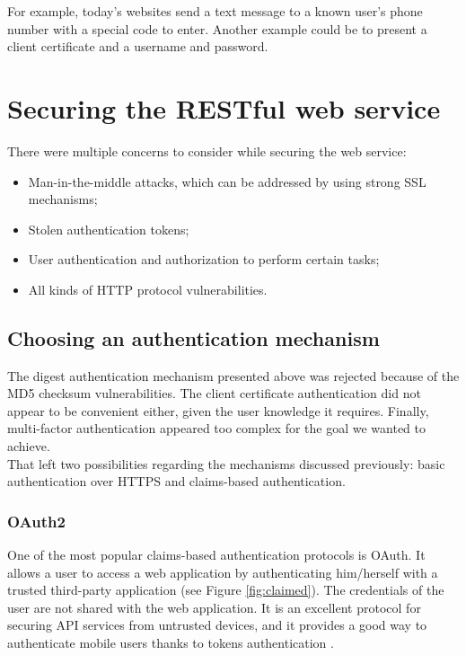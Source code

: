 \documentclass[a4paper, oneside, 11pt]{book}
\begin{document}
For example, today's websites send a text message to a known user's phone number with a special code to enter. Another example could be to present a client certificate and a username and password.

\section{Securing the RESTful web service}
There were multiple concerns to consider while securing the web service:
\begin{itemize}
	\item Man-in-the-middle attacks, which can be addressed by using strong SSL mechanisms;
	\item Stolen authentication tokens;
	\item User authentication and authorization to perform certain tasks;
	\item All kinds of HTTP protocol vulnerabilities.
\end{itemize}

\subsection{Choosing an authentication mechanism}
The digest authentication mechanism presented above was rejected because of the MD5 checksum vulnerabilities. The client certificate authentication did not appear to be convenient either, given the user knowledge it requires. Finally, multi-factor authentication appeared too complex for the goal we wanted to achieve.\\

That left two possibilities regarding the mechanisms discussed previously: basic authentication over HTTPS and claims-based authentication.

\subsubsection{OAuth2}
One of the most popular claims-based authentication protocols is OAuth. It allows a user to access a web application by authenticating him/herself with a trusted third-party application (see Figure \ref{fig:claimed}). The credentials of the user are not shared with the web application. It is an excellent protocol for securing API services from untrusted devices, and it provides a good way to authenticate mobile users thanks to tokens authentication \cite{OAuth:online}.\\
\end{document}
